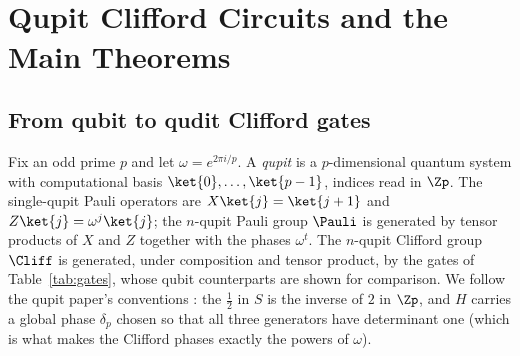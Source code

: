 \begin{code}[hide]
%
\>[2]\AgdaSpace{}%
\AgdaSymbol{:}\AgdaSpace{}%
\AgdaSpace{}%
\AgdaSpace{}%
\AgdaSpace{}%
\AgdaSpace{}%
\<%
\\
%
\\[\AgdaEmptyExtraSkip]%
\>[0]\AgdaSpace{}%
\AgdaSpace{}%
\<%
\\
\>[0][@{}l@{\AgdaIndent{0}}]%
\>[2]\AgdaSpace{}%
\AgdaSpace{}%
\AgdaSymbol{:}\AgdaSpace{}%
\<%
\\
\>[0]\AgdaSpace{}%
\AgdaSpace{}%
\<%
\\
\>[0][@{}l@{\AgdaIndent{0}}]%
\>[2]\AgdaSpace{}%
\AgdaSpace{}%
\AgdaSymbol{:}\AgdaSpace{}%
\<%
\\
\>[0]\AgdaSpace{}%
\AgdaSpace{}%
\<%
\\
\>[0][@{}l@{\AgdaIndent{0}}]%
\>[2]\AgdaSpace{}%
\AgdaSpace{}%
\AgdaSymbol{:}\AgdaSpace{}%
\<%
\end{code}
\section{Qupit Clifford Circuits and the Main Theorems}\label{sec:background}

\subsection{From qubit to qudit Clifford gates}

Fix an odd prime $p$ and let $\omega = e^{2\pi i/p}$.  A \emph{qupit} is
a $p$-dimensional quantum system with computational basis
$\ket{0},\dots,\ket{p-1}$, indices read in $\Zp$.  The single-qupit Pauli
operators are $X\ket{j} = \ket{j+1}$ and $Z\ket{j} = \omega^{j}\ket{j}$;
the $n$-qupit Pauli group $\Pauli$ is generated by tensor products of $X$
and $Z$ together with the phases $\omega^t$.  The $n$-qupit Clifford
group $\Cliff$ is generated, under composition and tensor product, by the
gates of Table~\ref{tab:gates}, whose qubit counterparts are shown for
comparison.  We follow the qupit paper's conventions
\cite{bian2026qudit}: the $\tfrac12$ in $S$ is the inverse of $2$ in
$\Zp$, and $H$ carries a global phase $\delta_p$ chosen so that all three
generators have determinant one (which is what makes the Clifford phases
exactly the powers of $\omega$).

